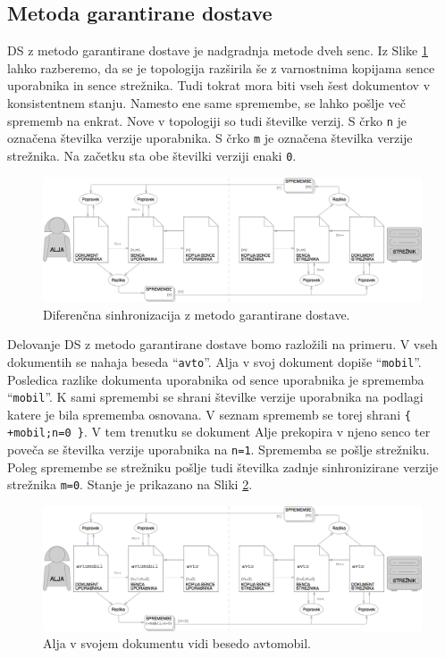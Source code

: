 \documentclass[a4paper, 12pt, twoside]{book}
\begin{document}
\subsection{Metoda garantirane dostave}

DS z metodo garantirane dostave je nadgradnja metode dveh senc. Iz Slike \ref{ds3} lahko razberemo, da se je topologija razširila še z varnostnima kopijama sence uporabnika in sence strežnika. Tudi tokrat mora biti vseh šest dokumentov v konsistentnem stanju. Namesto ene same spremembe, se lahko pošlje več sprememb na enkrat. Nove v topologiji so tudi številke verzij. S črko {\tt n} je označena številka verzije uporabnika. S črko {\tt m} je označena številka verzije strežnika. Na začetku sta obe številki verziji enaki {\tt 0}.

\begin{figure}[placement h]
\begin{center}
\includegraphics[width=16cm]{ds3.png}
\end{center}
\caption{Diferenčna sinhronizacija z metodo garantirane dostave.}
\label{ds3}
\end{figure}

Delovanje DS z metodo garantirane dostave bomo razložili na primeru. V vseh dokumentih se nahaja beseda “{\tt avto}”. Alja v svoj dokument dopiše “{\tt mobil}”. Posledica razlike dokumenta uporabnika od sence uporabnika je sprememba “{\tt mobil}”. K sami spremembi se shrani številke verzije uporabnika na podlagi katere je bila sprememba osnovana. V seznam sprememb se torej shrani {\tt \{ +mobil;n=0 \}}. V tem trenutku se dokument Alje prekopira v njeno senco ter poveča se številka verzije uporabnika na {\tt n=1}. Sprememba se pošlje strežniku. Poleg spremembe se strežniku pošlje tudi številka zadnje sinhronizirane verzije strežnika {\tt m=0}. Stanje je prikazano na Sliki \ref{ds4}.

\begin{figure}[placement h]
\begin{center}
\includegraphics[width=16cm]{ds4.png}
\end{center}
\caption{Alja v svojem dokumentu vidi besedo avtomobil.}
\label{ds4}
\end{figure}
\end{document}

